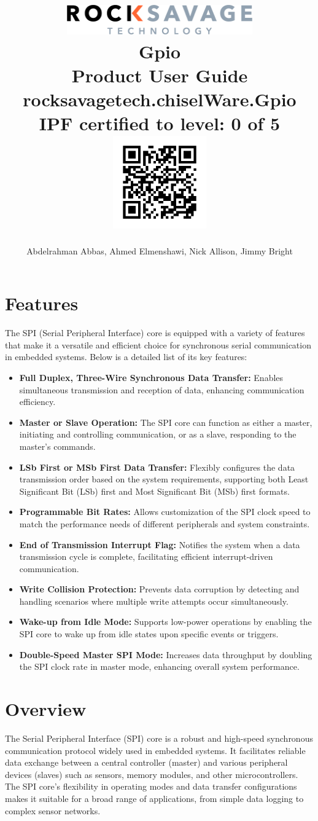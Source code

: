 \documentclass{article}
\title{
\includegraphics[width=8cm] {images/Rocksavage_Tech_RGB_300.png}\vspace{50pt}
\vspace{10pt} \\
\textbf{Gpio \\
  Product User Guide} \\
{\small{\textcolor{slate-grey}{rocksavagetech.chiselWare.Gpio}}} \\
\vspace{20pt} IPF certified to level:
\textbf{\textcolor{cert-level-0}{0} }of 5 \\
\vspace{5pt}
\includegraphics[width=4cm] {images/uncertified.png}
}
\author{Abdelrahman Abbas, Ahmed Elmenshawi, Nick Allison, Jimmy Bright}
\begin{document}
\maketitle
\newpage
\tableofcontents 
\newpage


\section{Features}
The SPI (Serial Peripheral Interface) core is equipped with a variety of features that make it a versatile and efficient choice for synchronous serial communication in embedded systems. Below is a detailed list of its key features:

\begin{itemize}
    \item \textbf{Full Duplex, Three-Wire Synchronous Data Transfer:} Enables simultaneous transmission and reception of data, enhancing communication efficiency.
    \item \textbf{Master or Slave Operation:} The SPI core can function as either a master, initiating and controlling communication, or as a slave, responding to the master's commands.
    \item \textbf{LSb First or MSb First Data Transfer:} Flexibly configures the data transmission order based on the system requirements, supporting both Least Significant Bit (LSb) first and Most Significant Bit (MSb) first formats.
    \item \textbf{Programmable Bit Rates:} Allows customization of the SPI clock speed to match the performance needs of different peripherals and system constraints.
    \item \textbf{End of Transmission Interrupt Flag:} Notifies the system when a data transmission cycle is complete, facilitating efficient interrupt-driven communication.
    \item \textbf{Write Collision Protection:} Prevents data corruption by detecting and handling scenarios where multiple write attempts occur simultaneously.
    \item \textbf{Wake-up from Idle Mode:} Supports low-power operations by enabling the SPI core to wake up from idle states upon specific events or triggers.
    \item \textbf{Double-Speed Master SPI Mode:} Increases data throughput by doubling the SPI clock rate in master mode, enhancing overall system performance.
\end{itemize}

\section{Overview}
The Serial Peripheral Interface (SPI) core is a robust and high-speed synchronous communication protocol widely used in embedded systems. It facilitates reliable data exchange between a central controller (master) and various peripheral devices (slaves) such as sensors, memory modules, and other microcontrollers. The SPI core's flexibility in operating modes and data transfer configurations makes it suitable for a broad range of applications, from simple data logging to complex sensor networks.
\end{document}
